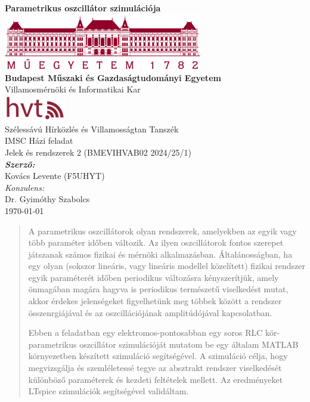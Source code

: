 \documentclass[12pt,a4paper]{article}
\begin{document}
\begin{titlepage}
    \centering
    \vspace*{\fill}
    \textbf{\Huge Parametrikus oszcillátor szimulációja}\\[2cm]
    \includegraphics[width=0.65\textwidth]{figures/bme_logo_nagy_bordo.jpg}\\[1cm]
    \textbf{\Large Budapest Műszaki és Gazdaságtudományi Egyetem}\\[0.25cm]
    \Large Villamosmérnöki és Informatikai Kar\\[1cm]
    \includegraphics[width=0.2\textwidth]{figures/hvt-logo.png}\\[0.25cm]
    \Large Szélessávú Hírközlés és Villamosságtan Tanszék\\[2cm]
    \Large IMSC Házi feladat\\[0.25cm]
    \Large Jelek és rendszerek 2 (BMEVIHVAB02 2024/25/1)\\[1.5cm]
    \Large \textbf{\textit{Szerző:}}\\[0.25cm]
    \Large Kovács Levente (F5UHYT)\\[1cm]
    \small \textit{Konzulens:}\\[0.25cm]
    \small Dr. Gyimóthy Szabolcs\\[2cm]
    \Large \today
    \vspace*{\fill}
\end{titlepage}
\newpage

\tableofcontents
\newpage

\begin{abstract}
    A parametrikus oszcillátorok olyan rendszerek, amelyekben az egyik vagy több paraméter időben változik. Az ilyen oszcillátorok fontos szerepet játszanak
    számos fizikai és mérnöki alkalmazásban. Általánosságban, ha egy olyan (sokszor lineáris, vagy lineáris modellel közelített) fizikai rendszer egyik paraméterét
    időben periodikus változásra kényszerítjük, amely önmagában magára hagyva is periodikus természetű viselkedést mutat, akkor érdekes jelenségeket figyelhetünk meg
    többek között a rendszer összenrgiájával és az oszcillációjának amplitúdójával kapcsolatban.

    Ebben a feladatban egy elektromos-pontosabban egy soros RLC kör-parametrikus oszcillátor szimulációját mutatom be egy általam MATLAB környezetben készített
    szimuláció segítségével. A szimuláció célja, hogy megvizsgálja és szemléletessé tegye az absztrakt rendszer viselkedését különböző paraméterek és kezdeti feltételek
    mellett. Az eredményeket LTspice szimulációk segítségével validáltam.
\end{abstract}
\end{document}
